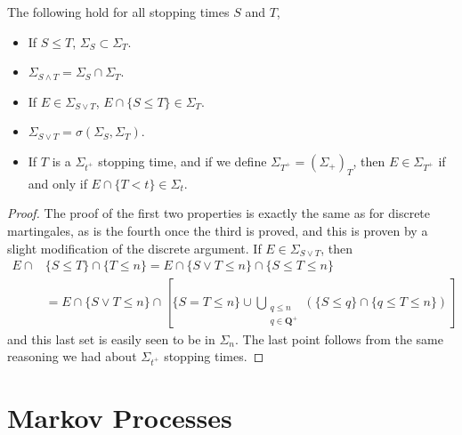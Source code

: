 \begin{lemma}
    The following hold for all stopping times $S$ and $T$,
    \begin{itemize}
        \item If $S \leq T$, $\Sigma_S \subset \Sigma_T$.
        \item $\Sigma_{S \wedge T} = \Sigma_S \cap \Sigma_T$.
        \item If $E \in \Sigma_{S \vee T}$, $E \cap \{ S \leq T \} \in \Sigma_T$.
        \item $\Sigma_{S \vee T} = \sigma(\Sigma_S, \Sigma_T)$.
        \item If $T$ is a $\Sigma_{t^+}$ stopping time, and if we define $\Sigma_{T^+} = (\Sigma_+)_T$, then $E \in \Sigma_{T^+}$ if and only if $E \cap \{ T < t \} \in \Sigma_t$.
    \end{itemize}
\end{lemma}
\begin{proof}
    The proof of the first two properties is exactly the same as for discrete martingales, as is the fourth once the third is proved, and this is proven by a slight modification of the discrete argument. If $E \in \Sigma_{S \vee T}$, then
    \begin{align*}
        E \cap &\{ S \leq T \} \cap \{ T \leq n \} = E \cap \{ S \vee T \leq n \} \cap \{ S \leq T \leq n \}\\
        &= E \cap \{ S \vee T \leq n \} \cap \left[ \{ S = T \leq n \} \cup \bigcup_{\substack{q \leq n\\q \in \mathbf{Q}^+}} (\{ S \leq q \} \cap \{ q \leq T \leq n \}) \right]
    \end{align*}
    and this last set is easily seen to be in $\Sigma_n$. The last point follows from the same reasoning we had about $\Sigma_{t^+}$ stopping times.
\end{proof}

\chapter{Markov Processes}

